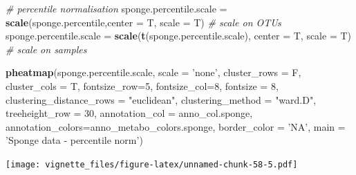 \documentclass[]{book}
\newenvironment{Shaded}{\begin{snugshade}}{\end{snugshade}}
\newcommand{\KeywordTok}[1]{\textcolor[rgb]{0.13,0.29,0.53}{\textbf{#1}}}
\newcommand{\DataTypeTok}[1]{\textcolor[rgb]{0.13,0.29,0.53}{#1}}
\newcommand{\DecValTok}[1]{\textcolor[rgb]{0.00,0.00,0.81}{#1}}
\newcommand{\StringTok}[1]{\textcolor[rgb]{0.31,0.60,0.02}{#1}}
\newcommand{\CommentTok}[1]{\textcolor[rgb]{0.56,0.35,0.01}{\textit{#1}}}
\newcommand{\NormalTok}[1]{#1}
\begin{document}
\begin{Shaded}
\begin{Highlighting}[]
\CommentTok{# percentile normalisation}
\NormalTok{sponge.percentile.scale =}\StringTok{ }\KeywordTok{scale}\NormalTok{(sponge.percentile,}\DataTypeTok{center =}\NormalTok{ T, }\DataTypeTok{scale =}\NormalTok{ T) }\CommentTok{# scale on OTUs}
\NormalTok{sponge.percentile.scale =}\StringTok{ }\KeywordTok{scale}\NormalTok{(}\KeywordTok{t}\NormalTok{(sponge.percentile.scale), }\DataTypeTok{center =}\NormalTok{ T, }\DataTypeTok{scale =}\NormalTok{ T) }\CommentTok{# scale on samples}

\KeywordTok{pheatmap}\NormalTok{(sponge.percentile.scale, }
         \DataTypeTok{scale =} \StringTok{'none'}\NormalTok{, }
         \DataTypeTok{cluster_rows =}\NormalTok{ F, }
         \DataTypeTok{cluster_cols =}\NormalTok{ T, }
         \DataTypeTok{fontsize_row=}\DecValTok{5}\NormalTok{, }\DataTypeTok{fontsize_col=}\DecValTok{8}\NormalTok{,}
         \DataTypeTok{fontsize =} \DecValTok{8}\NormalTok{,}
         \DataTypeTok{clustering_distance_rows =} \StringTok{"euclidean"}\NormalTok{,}
         \DataTypeTok{clustering_method =} \StringTok{"ward.D"}\NormalTok{,}
         \DataTypeTok{treeheight_row =} \DecValTok{30}\NormalTok{,}
         \DataTypeTok{annotation_col =}\NormalTok{ anno_col.sponge,}
         \DataTypeTok{annotation_colors=}\NormalTok{anno_metabo_colors.sponge,}
         \DataTypeTok{border_color =} \StringTok{'NA'}\NormalTok{,}
         \DataTypeTok{main =} \StringTok{'Sponge data - percentile norm'}\NormalTok{)}
\end{Highlighting}
\end{Shaded}

\texttt{[image: vignette\_files/figure-latex/unnamed-chunk-58-5.pdf]}
\end{document}
